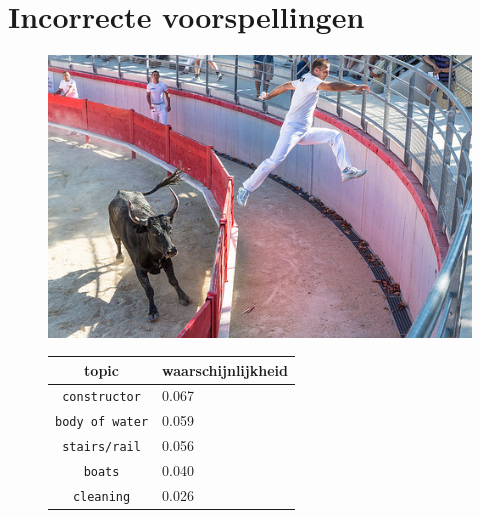 \section{Incorrecte voorspellingen}
\begin{figure}[!htb]
    \centering
    \begin{minipage}[t]{.5\linewidth}
    \centering
    \vspace{0pt}
    \includegraphics[width=\textwidth]{Images/LDA/7446693604.jpg}
    \end{minipage}\hfill
    \begin{minipage}[t]{.5\textwidth}
    \centering
    \vspace{0pt}
    \begin{tabular}{cl}
            topic                           & waarschijnlijkheid\\
            \hline
            \texttt{constructor}             & 0.067 \\
            \texttt{body of water}                   & 0.059 \\
            \texttt{stairs/rail}                 & 0.056 \\
            \texttt{boats}           & 0.040 \\
            \texttt{cleaning}        & 0.026\\
            \hline
        \end{tabular}
    \end{minipage}
\end{figure}